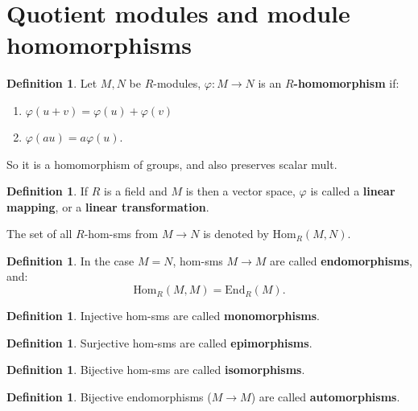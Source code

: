 \documentclass[9pt,reqno,twoside]{amsbook}
\theoremstyle{plain}
\numberwithin{section}{chapter}
\numberwithin{equation}{chapter}
\theoremstyle{definition}
\newtheorem{Def}[theorem]{Definition}
\theoremstyle{remark}
\theoremstyle{plain}
\renewcommand{\phi}{\varphi}
\begin{document}
\section{Quotient modules and module homomorphisms}

\begin{Def}
Let $M,N$ be $R$-modules, $\phi:M\to N$ is an \textbf{$R$-homomorphism} if: 
\begin{enumerate}
\item $\phi(u + v) = \phi(u) + \phi(v)$
\item $\phi(au) = a\phi(u)$.
\end{enumerate}
\end{Def}
So it is a homomorphism of groups, and also preserves scalar mult. 
\begin{Def}
If $R$ is a field and $M$ is then a vector space, $\phi$ is called a \textbf{linear mapping}, or a \textbf{linear transformation}. 
\end{Def}

The set of all $R$-hom-sms from $M\to N$ is denoted by $\text{Hom}_R(M,N)$. 
\begin{Def}In the case $M = N$, hom-sms $M \to M$ are called \textbf{endomorphisms}, and:
$$
\text{Hom}_R(M,M) = \text{End}_R(M). 
$$
\end{Def}
\begin{Def}
Injective hom-sms are called \textbf{monomorphisms}. 
\end{Def}

\begin{Def}
Surjective hom-sms are called \textbf{epimorphisms}. 
\end{Def}

\begin{Def}
Bijective hom-sms are called \textbf{isomorphisms}. 
\end{Def}

\begin{Def}
Bijective endomorphisms ($M \to M$) are called \textbf{automorphisms}. 
\end{Def}
\end{document}
